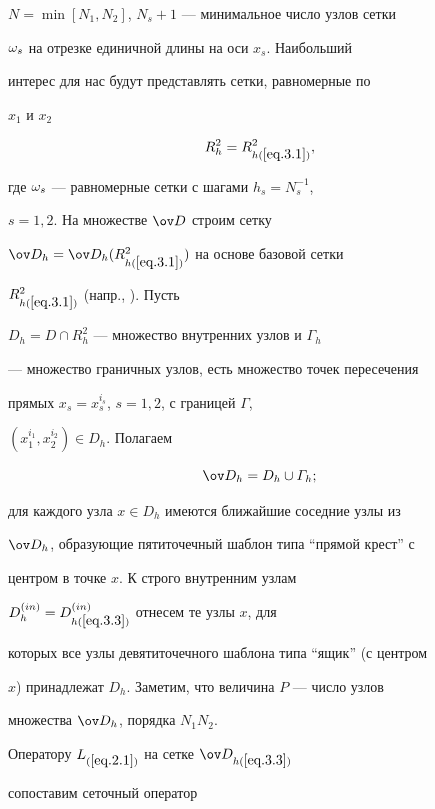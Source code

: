 $N=\min[N_1,N_2]$, $N_s+1$ --- минимальное число узлов сетки


$\omega_s$ на отрезке единичной длины на оси $x_s$. Наибольший


интерес для нас будут представлять сетки, равномерные по


$x_1$ и $x_2$


\begin{equation}\label{eq.3.2}


R_h^2=R_{h(\ref{eq.3.1})}^2,


\end{equation}


где $\omega_s$ --- равномерные сетки с шагами $h_s=N_s^{-1}$,


$s=1,2$. На множестве $\od$ строим сетку


$\od_h=\od_h(R_{h(\ref{eq.3.1})}^2)$ на основе базовой сетки


$R_{h(\ref{eq.3.1})}^2$ (напр., \cite{8}). Пусть


$D_h=D\cap R_h^2$ --- множество внутренних узлов и $\varGamma_h$


--- множество граничных узлов, есть множество точек пересечения


прямых $x_s=x_s^{i_s}$, $s=1,2$, с границей $\varGamma$,


$(x_1^{i_1},x_2^{i_2})\in D_h$. Полагаем


\begin{equation}\label{eq.3.3}


\od_h=D_h\cup\varGamma_h;


\end{equation}


для каждого узла $x\in D_h$ имеются ближайшие соседние узлы из


$\od_h$, образующие пятиточечный шаблон типа ``прямой крест'' с


центром в точке $x$. К строго внутренним узлам


$D_h^{(in)}=D_{h(\ref{eq.3.3})}^{(in)}$ отнесем те узлы $x$, для


которых все узлы девятиточечного шаблона типа ``ящик'' (с центром


$x$) принадлежат $D_h$. Заметим, что величина $P$ --- число узлов


множества $\od_h$, порядка $N_1N_2$.





Оператору $L_{(\ref{eq.2.1})}$ на сетке $\od_{h(\ref{eq.3.3})}$


сопоставим сеточный оператор



